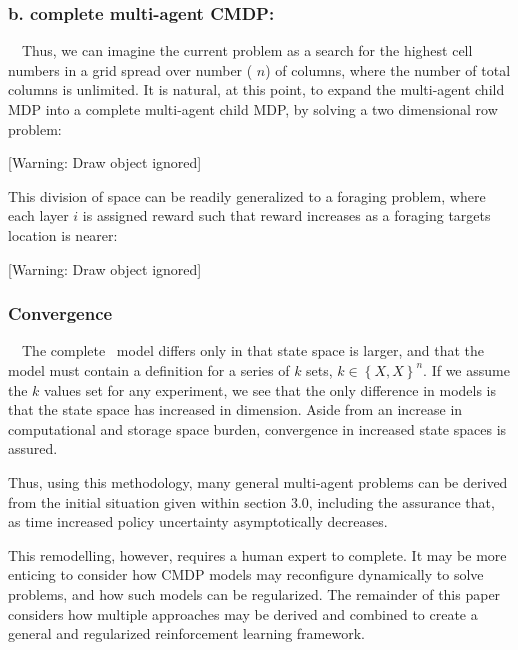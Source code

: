 \documentclass{article}
\begin{document}
\subsubsection{b. complete multi-agent CMDP:}
\ \ Thus, we can imagine the current problem as a search for the highest cell numbers in a grid spread over number ( $n$) of columns, where the number of total columns is unlimited. It is natural, at this point, to expand the multi-agent child MDP into a complete multi-agent child MDP, by solving a two dimensional row problem: 

[Warning: Draw object ignored]

This division of space can be readily generalized to a foraging problem, where each layer  $i$ is assigned reward such that reward increases as a foraging targets location is nearer:

[Warning: Draw object ignored]

\subsubsection{}
\subsubsection{Convergence}
\ \ The complete \ model differs only in that state space is larger, and that the model must contain a definition for a series of  $k$ sets,  $k{\in}\left\{X,X\right\}^n$. If we assume the  $k$ values set for any experiment, we see that the only difference in models is that the state space has increased in dimension. Aside from an increase in computational and storage space burden, convergence in increased state spaces is assured.

Thus, using this methodology, many general multi-agent problems can be derived from the initial situation given within section 3.0, including the assurance that, as time increased policy uncertainty asymptotically decreases.

This remodelling, however, requires a human expert to complete. It may be more enticing to consider how CMDP models may reconfigure dynamically to solve problems, and how such models can be regularized. The remainder of this paper considers how multiple approaches may be derived and combined to create a general and regularized reinforcement learning framework.
\end{document}
